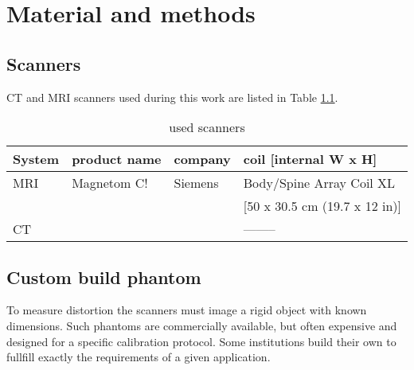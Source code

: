 

\chapter{Material and methods}


\section{Scanners}

CT and MRI scanners used during this work are listed in Table \ref{tab:scanners}.

\begin{table}[h]
\centering
\begin{tabular}{llll}
System	& product name	& company	& coil [internal W x H]		\\
\toprule
MRI	& Magnetom C!	& Siemens	& Body/Spine Array Coil XL	\\
	&		&		& [50 x 30.5 cm (19.7 x 12 in)]	\\
CT	&		&		& --------
\end{tabular}
\caption{used scanners}
\label{tab:scanners}
\end{table}

\section{Custom build phantom}

To measure distortion the scanners must image a rigid object with known dimensions.
Such phantoms are commercially available, but often expensive and designed for a specific calibration protocol.
Some institutions build their own to fullfill exactly the requirements of a given application.

